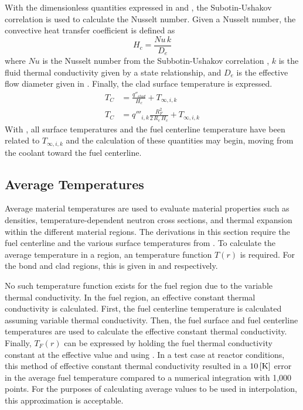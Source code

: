       With the dimensionless quantities expressed in  and
      , the Subotin-Ushakov correlation is used to calculate the 
      Nusselt number. Given a Nusselt number, the convective heat transfer 
      coefficient is defined as
      \begin{equation}
        \label{eq:hc}
        H_c = \frac{N\!u \, k}{D_e}
      \end{equation}
      where $Nu$ is the Nusselt number from the Subbotin-Ushakov correlation
      , $k$ is the fluid thermal conductivity given by 
      a state relationship, and $D_e$ is the effective flow diameter given in
      . Finally, the clad surface temperature is 
      expressed.
      \begin{align}
        T_C &= \frac{q''_{clad}}{H_c} + T_{\infty,i,k} \\
        \label{eq:tc}
        T_C &= q'''_{i,k} \frac{R_F^2}{2\,R_c\,H_c} + T_{\infty,i,k}
      \end{align}
      With , all surface temperatures and the fuel centerline
      temperature have been related to $T_{\infty,i,k}$ and the calculation of 
      these quantities may begin, moving from the coolant toward the fuel 
      centerline.

  \subsection{Average Temperatures}
    \label{sec:average_temps}
    Average material temperatures are used to evaluate material properties such
    as densities, temperature-dependent neutron cross sections, and thermal 
    expansion within the different material regions. The derivations in this
    section require the fuel centerline and the various surface temperatures
    from . To calculate the average temperature in a
    region, an temperature function $T(r)$ is required. For the bond and clad
    regions, this is given in  and  respectively.

    No such temperature function exists for the fuel region due to the variable
    thermal conductivity. In the fuel region, an effective constant thermal
    conductivity is calculated. First, the fuel centerline temperature is
    calculated assuming variable thermal conductivity. Then, the fuel surface
    and fuel centerline temperatures are used to calculate the effective
    constant thermal conductivity. Finally, $T_F(r)$ can be expressed by
    holding the fuel thermal conductivity constant at the effective value and
    using . In a test case at reactor conditions,
    this method of effective constant thermal conductivity resulted in a $10
    \left[\text{{K}}\right]$ error in the average fuel temperature compared to a numerical
    integration with 1,000 points. For the purposes of calculating average
    values to be used in interpolation, this approximation is acceptable.

